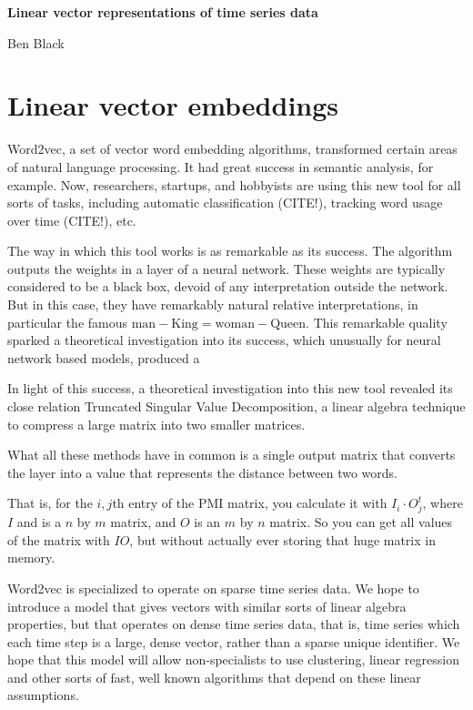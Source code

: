 \documentclass{article}
\begin{document}
\hfill \textbf{Linear vector representations of time series data}

\hfill Ben Black

\section{Linear vector embeddings}

Word2vec, a set of vector word embedding algorithms, transformed certain areas of natural language processing. It had great success in semantic analysis, for example.\cite{w2v1} Now, researchers, startups, and hobbyists are using this new tool for all sorts of tasks, including automatic classification (CITE!), tracking word usage over time (CITE!), etc. 

The way in which this tool works is as remarkable as its success. The algorithm outputs the weights in a layer of a neural network. These weights are typically considered to be a black box, devoid of any interpretation outside the network. But in this case, they have remarkably natural relative interpretations, in particular the famous $\text{man} - \text{King} = \text{woman} - \text{Queen}$. This remarkable quality sparked a theoretical investigation into its success, which unusually for neural network based models, produced a 

In light of this success, a theoretical investigation into this new tool revealed its close relation Truncated Singular Value Decomposition, a linear algebra technique to compress a large matrix into two smaller matrices. 
\cite{random_walk_pmi}
\cite{NIPS2014_5477}


What all these methods have in common is a single output matrix that converts the layer into a value that represents the distance between two words. 

That is, for the $i,j$th entry of the PMI matrix, you calculate it with $I_i \cdot O^t_j$, where $I$ and is a $n$ by $m$ matrix, and $O$ is an $m$ by $n$ matrix.  So you can get all values of the matrix with $IO$, but without actually ever storing that huge matrix in memory. 


Word2vec is specialized to operate on sparse time series data. We hope to introduce a model that gives vectors with similar sorts of linear algebra properties, but that operates on dense time series data, that is, time series which each time step is a large, dense vector, rather than a sparse unique identifier. We hope that this model will allow non-specialists to use clustering, linear regression and other sorts of fast, well known algorithms that depend on these linear assumptions. 
\end{document}
